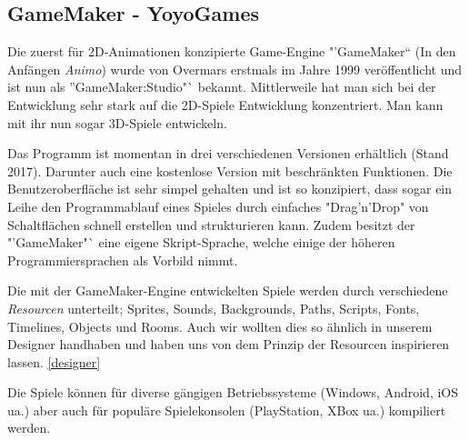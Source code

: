 \subsection{GameMaker - YoyoGames}

Die zuerst für 2D-Animationen konzipierte Game-Engine "'GameMaker"` (In den Anfängen \textit{Animo}) wurde von Overmars erstmals im Jahre 1999 veröffentlicht und ist nun als "'GameMaker:Studio"` bekannt. Mittlerweile hat man sich bei der Entwicklung sehr stark auf die 2D-Spiele Entwicklung konzentriert. Man kann mit ihr nun sogar 3D-Spiele entwickeln. 

Das Programm ist momentan in drei verschiedenen Versionen erhältlich (Stand 2017). Darunter auch eine kostenlose Version mit beschränkten Funktionen.
Die Benutzeroberfläche ist sehr simpel gehalten und ist so konzipiert, dass sogar ein Leihe den Programmablauf eines Spieles durch einfaches "Drag'n'Drop" von Schaltflächen schnell erstellen und strukturieren kann. Zudem besitzt der "'GameMaker"` eine eigene Skript-Sprache, welche einige der höheren Programmiersprachen als Vorbild nimmt.

Die mit der GameMaker-Engine entwickelten Spiele werden durch verschiedene \textit{Resourcen} unterteilt;
Sprites, Sounds, Backgrounds, Paths, Scripts, Fonts, Timelines, Objects und Rooms. 
Auch wir wollten dies so ähnlich in unserem Designer handhaben und haben uns von dem Prinzip der Resourcen inspirieren lassen. \ref{designer}

Die Spiele können für diverse gängigen Betriebssysteme (Windows, Android, iOS ua.) aber auch für populäre Spielekonsolen (PlayStation, XBox ua.) kompiliert werden. 